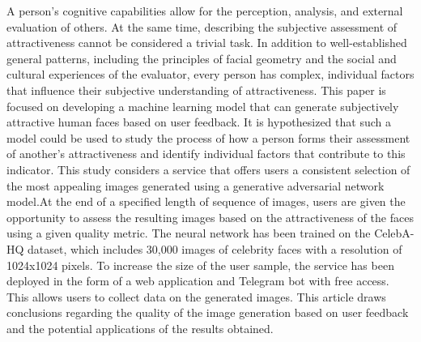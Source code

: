 \documentclass[60x84/16,8pt]{ittmm}
\begin{document}



\begin{altabstract}
A person's cognitive capabilities allow for the perception, analysis, and external evaluation of others.
At the same time, describing the subjective assessment of attractiveness cannot be considered a trivial task.
In addition to well-established general patterns, including the principles of facial geometry and the social and cultural experiences of the evaluator,
every person has complex, individual factors that influence their subjective understanding of attractiveness.
This paper is focused on developing a machine learning model that can generate subjectively attractive human faces based on user feedback.
It is hypothesized that such a model could be used to study the process of how a person forms their assessment of another's attractiveness
and identify individual factors that contribute to this indicator. This study considers a service that offers users a consistent selection
of the most appealing images generated using a generative adversarial network model.At the end of a specified length of sequence of images,
users are given the opportunity to assess the resulting images based on the attractiveness of the faces using a given quality metric.
The neural network has been trained on the CelebA-HQ dataset, which includes 30,000 images of celebrity faces with a resolution of 1024x1024 pixels.
To increase the size of the user sample, the service has been deployed in the form of a web application and Telegram bot with free access.
This allows users to collect data on the generated images.
This article draws conclusions regarding the quality of the image generation based on user feedback and the potential applications of the results obtained.
  
\end{altabstract}


\maketitle
\end{document}

